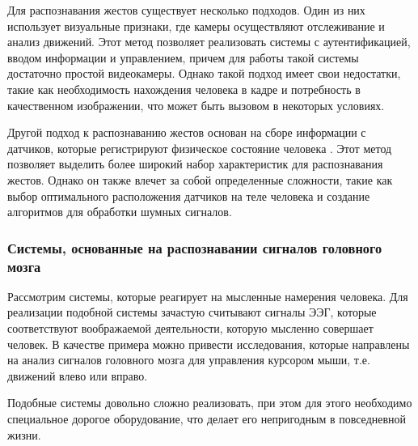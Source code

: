 Для распознавания жестов существует несколько подходов. Один из них использует визуальные признаки, где камеры осуществляют отслеживание и анализ движений. Этот метод позволяет реализовать системы с аутентификацией, вводом информации и управлением, причем для работы такой системы достаточно простой видеокамеры. Однако такой подход имеет свои недостатки, такие как необходимость нахождения человека в кадре и потребность в качественном изображении, что может быть вызовом в некоторых условиях.

Другой подход к распознаванию жестов основан на сборе информации с датчиков, которые регистрируют физическое состояние человека \cite{bib:EMG:2}. Этот метод позволяет выделить более широкий набор характеристик для распознавания жестов. Однако он также влечет за собой определенные сложности, такие как выбор оптимального расположения датчиков на теле человека и создание алгоритмов для обработки шумных сигналов.

\subsubsection{Системы, основанные на распознавании сигналов головного мозга}

Рассмотрим системы, которые реагирует на мысленные намерения человека. Для реализации подобной системы зачастую считывают сигналы ЭЭГ, которые соответствуют воображаемой деятельности, которую мысленно совершает человек. В качестве примера можно привести исследования, которые направлены на анализ сигналов головного мозга для управления курсором мыши, т.е. движений влево или вправо.

Подобные системы довольно сложно реализовать, при этом для этого необходимо специальное дорогое оборудование, что делает его непригодным в повседневной жизни.
